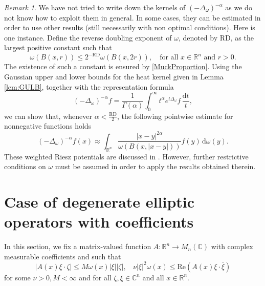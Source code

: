 \documentclass[12pt, letterpaper]{amsart}
\theoremstyle{definition}
\theoremstyle{remark}
\newtheorem{rem}[thm]{Remark}
\numberwithin{equation}{section}
\begin{document}
{\begin{rem} We have not tried to write down the kernels of $(-\Delta_\omega)^{-\alpha}$ as we do not know how to exploit them in general. In some cases, they can be estimated in order to use other results (still necessarily with non optimal conditions). Here is one instance.
    Define the reverse doubling  exponent of $\omega$, denoted by $\mathrm{RD}$, as the largest positive constant such that
    \begin{equation*}
    \omega(B(x,r)) \leq 2^{-\mathrm{RD}} \omega(B(x,2r)), \quad \text{for all } x \in \mathbb{R}^n \text{ and } r > 0.
    \end{equation*}
    The existence of such a constant is ensured by \eqref{MuckProportion}. Using the Gaussian upper and lower bounds for the heat kernel given in Lemma \ref{lem:GULB}, together with the representation formula
    \begin{equation*}
    (-\Delta_\omega)^{-\alpha}f = \frac{1}{\Gamma(\alpha)} \int_{0}^{\infty} t^{\alpha} e^{t\Delta_\omega}f \, \frac{\mathrm{d}t}{t},
    \end{equation*}
    we can show that, whenever $\alpha < \frac{\mathrm{RD}}{2}$, the following pointwise estimate for nonnegative functions holds
    \begin{equation*}
    (-\Delta_\omega)^{-\alpha}f(x) \approx \int_{\mathbb{R}^n} \frac{|x - y|^{2\alpha}}{\omega(B(x, |x - y|))} f(y) \, \mathrm{d}\omega(y).
    \end{equation*}
    These weighted Riesz potentials are discussed in \cite[section 5]{auscher2008weighted}. However, further restrictive conditions on $\omega$ must be assumed in order to apply the results obtained therein.
\end{rem}

\section{Case of degenerate elliptic operators with coefficients}\label{section: coeff}
In this section, we fix a matrix-valued function $A:  \mathbb{R}^n \rightarrow M_n(\mathbb{C})$ with complex measurable coefficients and such that 
\begin{equation*}
\left | A(x)\xi \cdot \zeta  \right |\leq M \omega(x)\left | \xi \right |\left | \zeta  \right |, \ \ \ \  
\nu \left | \xi \right |^2\omega(x)\leq \mathrm{Re}( A(x)\xi\cdot \overline{\xi})
\end{equation*}
for some $\nu>0, M<\infty$ and for all $\zeta, \xi \in \mathbb{C}^n$ and all $x \in \mathbb{R}^n$.

}
\end{document}
